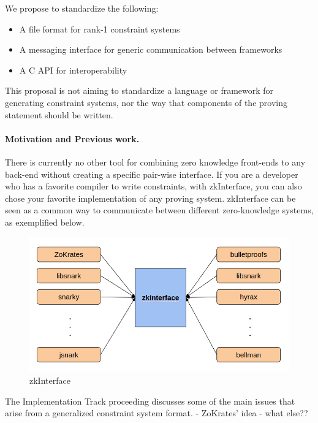 \documentclass[a4paper,11pt]{article}
\begin{document}
		We propose to standardize the following:
		\begin{itemize}
			\item A file format for rank-1 constraint systems
			\item A messaging interface  for generic communication between frameworks
			\item A C API for interoperability
		\end{itemize}
		
		This proposal is not aiming to standardize a language or framework for generating constraint systems, nor the way that components of the proving statement should be written.  
		
		
		\paragraph{Motivation and Previous work.} There is currently no other tool for combining zero knowledge front-ends to any back-end without creating a specific pair-wise interface. If you are a developer who has a favorite compiler to write constraints, with zkInterface, you can also chose your favorite implementation of any proving system. zkInterface can be seen as a common way to communicate between different zero-knowledge systems, as exemplified below.
		
		\begin{figure}[h!]
			\includegraphics[width=\linewidth]{interface.png}
			\caption{zkInterface}
			\label{interface}
		\end{figure}
		
		The Implementation Track proceeding discusses some of the main issues that arise from a generalized constraint system format. 
		- ZoKrates' idea
		- what else??
		
		
		
		
		
	
\end{document}
